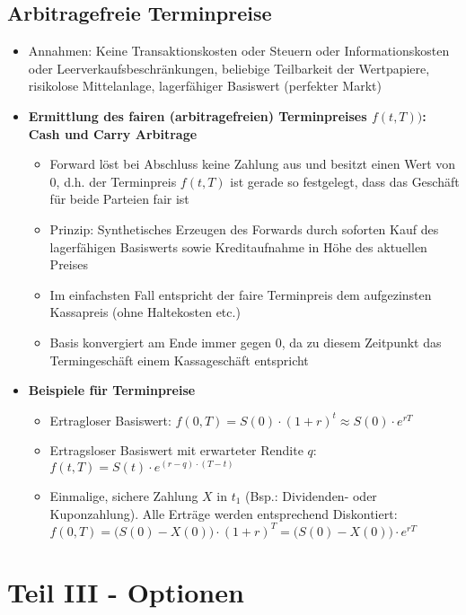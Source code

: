 \subsection{Arbitragefreie Terminpreise}
\begin{itemize}
	\item Annahmen: Keine Transaktionskosten oder Steuern oder Informationskosten oder Leerverkaufsbeschränkungen, beliebige Teilbarkeit der Wertpapiere, risikolose Mittelanlage, lagerfähiger Basiswert (perfekter Markt)
	\item \textbf{Ermittlung des fairen (arbitragefreien) Terminpreises \(f(t,T))\): Cash und Carry Arbitrage}
	\begin{itemize}
		\item Forward löst bei Abschluss keine Zahlung aus und besitzt einen Wert von \(0\), d.h. der Terminpreis \(f(t,T)\) ist gerade so festgelegt, dass das Geschäft für beide Parteien fair ist
		\item Prinzip: Synthetisches Erzeugen des Forwards durch soforten Kauf des lagerfähigen Basiswerts sowie Kreditaufnahme in Höhe des aktuellen Preises
		\item Im einfachsten Fall entspricht der faire Terminpreis dem aufgezinsten Kassapreis (ohne Haltekosten etc.)
		\item Basis konvergiert am Ende immer gegen \(0\), da zu diesem Zeitpunkt das Termingeschäft einem Kassageschäft entspricht
	\end{itemize}
	\item \textbf{Beispiele für Terminpreise}
	\begin{itemize}
		\item Ertragloser Basiswert: \(f(0,T) = S(0)\cdot(1+r)^t \approx S(0) \cdot e^{rT}\)
		\item Ertragsloser Basiswert mit erwarteter Rendite \(q\): \(f(t,T) = S(t) \cdot e^{(r-q)\cdot (T-t)}\)
		\item Einmalige, sichere Zahlung \(X\) in \(t_1\) (Bsp.: Dividenden- oder Kuponzahlung). Alle Erträge werden entsprechend Diskontiert: \(f(0,T) = \big(S(0)-X(0)\big)\cdot (1+r)^T = \big(S(0)-X(0)\big)\cdot e^{rT}\)
	\end{itemize}
\end{itemize}



\section{Teil III - Optionen}


